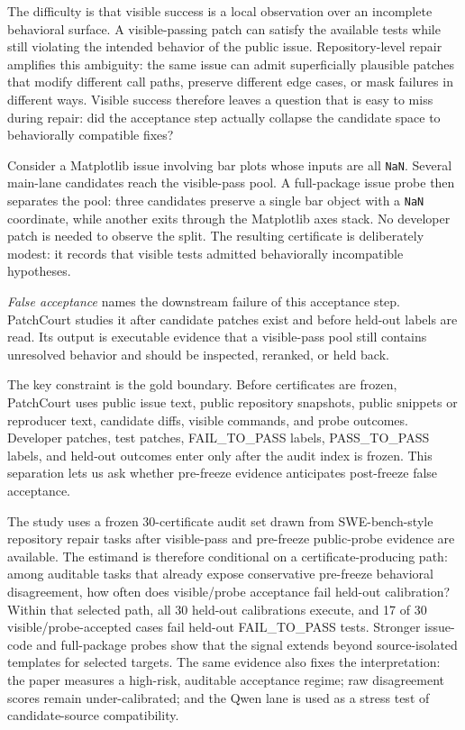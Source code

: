 \documentclass[conference]{IEEEtran}
\newcommand{\patchcourt}{PatchCourt\xspace}
\begin{document}
The difficulty is that visible success is a local observation over an incomplete behavioral surface.
A visible-passing patch can satisfy the available tests while still violating the intended behavior of the public issue.
Repository-level repair amplifies this ambiguity: the same issue can admit superficially plausible patches that modify different call paths, preserve different edge cases, or mask failures in different ways.
Visible success therefore leaves a question that is easy to miss during repair: did the acceptance step actually collapse the candidate space to behaviorally compatible fixes?

Consider a Matplotlib issue involving bar plots whose inputs are all \texttt{NaN}.
Several main-lane candidates reach the visible-pass pool.
A full-package issue probe then separates the pool: three candidates preserve a single bar object with a \texttt{NaN} coordinate, while another exits through the Matplotlib axes stack.
No developer patch is needed to observe the split.
The resulting certificate is deliberately modest: it records that visible tests admitted behaviorally incompatible hypotheses.

\emph{False acceptance} names the downstream failure of this acceptance step.
\patchcourt studies it after candidate patches exist and before held-out labels are read.
Its output is executable evidence that a visible-pass pool still contains unresolved behavior and should be inspected, reranked, or held back.

The key constraint is the gold boundary.
Before certificates are frozen, \patchcourt uses public issue text, public repository snapshots, public snippets or reproducer text, candidate diffs, visible commands, and probe outcomes.
Developer patches, test patches, FAIL\_TO\_PASS labels, PASS\_TO\_PASS labels, and held-out outcomes enter only after the audit index is frozen.
This separation lets us ask whether pre-freeze evidence anticipates post-freeze false acceptance.

The study uses a frozen 30-certificate audit set drawn from SWE-bench-style repository repair tasks after visible-pass and pre-freeze public-probe evidence are available.
The estimand is therefore conditional on a certificate-producing path: among auditable tasks that already expose conservative pre-freeze behavioral disagreement, how often does visible/probe acceptance fail held-out calibration?
Within that selected path, all 30 held-out calibrations execute, and 17 of 30 visible/probe-accepted cases fail held-out FAIL\_TO\_PASS tests.
Stronger issue-code and full-package probes show that the signal extends beyond source-isolated templates for selected targets.
The same evidence also fixes the interpretation: the paper measures a high-risk, auditable acceptance regime; raw disagreement scores remain under-calibrated; and the Qwen lane is used as a stress test of candidate-source compatibility.
\end{document}
